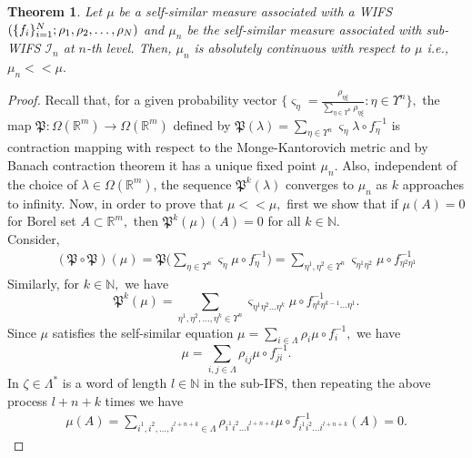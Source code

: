 \documentclass{amsproc}
\newtheorem{theorem}{Theorem}[section]
\theoremstyle{definition}
\theoremstyle{remark}
\numberwithin{equation}{section}
\begin{document}
\begin{theorem}\label{Lem24}
    Let $\mu$ be a self-similar measure associated with a WIFS $(\{f_i\}_{i=1}^N; \\ \rho_1 ,\rho_2,\ldots,\rho_N)$ and $\mu_n$ be the self-similar measure associated with sub-WIFS $\mathcal{I}_n$ at $n$-th level. Then, $\mu_n$ is absolutely continuous with respect to $\mu$ i.e., $\mu_n << \mu.$
\end{theorem}
\begin{proof}
    Recall that, for a given probability vector $\{\varsigma_{\eta}= \frac{\rho_{ \eta \xi}}{ \sum_{\eta \in \Upsilon^n} \rho_{\eta \xi}}: \eta \in \Upsilon^n\},$ the map $\mathfrak{P}: \Omega(\mathbb{R}^m) \to \Omega(\mathbb{R}^m)$ defined by $\mathfrak{P}(\lambda)= \sum_{\eta \in \Upsilon^n} \varsigma_{\eta} \lambda \circ f_{\eta}^{-1}$ is contraction mapping with respect to the Monge-Kantorovich metric and by Banach contraction theorem it has a unique fixed point $\mu_n$. Also, independent of the choice of $\lambda \in \Omega(\mathbb{R}^m)$, the sequence $\mathfrak{P}^k(\lambda)$ converges to $\mu_n$ as $k$ approaches to infinity. Now, in order to prove that $\mu << \mu,$ first we show that if $\mu(A)=0$ for Borel set $A \subset \mathbb{R}^m,$ then $\mathfrak{P}^k(\mu)(A)= 0$ for all $k \in \mathbb{N}.$\\
    Consider, 
\begin{equation}\label{eq24}
\begin{aligned}
(\mathfrak{P} \circ \mathfrak{P})(\mu) = \mathfrak{P}\bigg(\sum_{\eta \in \Upsilon^n} \varsigma_{\eta} \mu \circ f_{\eta}^{-1} \bigg) = \sum_{\eta^1, \eta^2 \in \Upsilon^n}\varsigma_{\eta^1 \eta^2} \mu \circ f_{\eta^2 \eta^1}^{-1} 
\end{aligned}
\end{equation}
    Similarly, for $k \in \mathbb{N},$ we have 
    \[  \mathfrak{P}^k(\mu)= \sum_{\eta^1,\eta^2,\ldots,\eta^k \in \Upsilon^n} \varsigma_{\eta^1\eta^2\ldots\eta^k} \mu \circ f_{\eta^k \eta^{k-1}\ldots \eta^1}^{-1}.\]
    Since $\mu$ satisfies the self-similar equation $\mu= \sum_{i \in \Lambda} \rho_i \mu \circ f_{i}^{-1},$ we have 
    \[\mu= \sum_{i,j \in \Lambda} \rho_{ij} \mu \circ f_{ji}^{-1}.\]
    In $\zeta \in \Lambda^*$ is a word of length $l \in \mathbb{N}$ in the sub-IFS, then repeating the above process $l+n+k$ times we have 
    \begin{equation}\label{eq25}
    \begin{aligned}
        \mu(A) = \sum_{i^1,i^2,\ldots,i^{l+n+k} \in \Lambda} \rho_{i^1i^2\ldots i^{l+n+k}} \mu \circ f_{i^1i^2\ldots i^{l+n+k}}^{-1}(A)=0.
         \end{aligned}
    \end{equation}
    \end{proof}  
\end{document}
